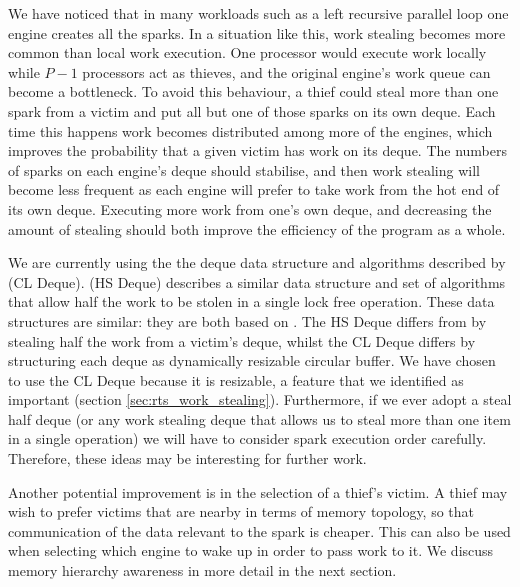 We have noticed that in many workloads such as a left recursive parallel
loop one engine creates all the sparks.
In a situation like this,
work stealing becomes more common than local work execution.
One processor would execute work locally while $P - 1$ processors act as
thieves,
and the original engine's work queue can become a bottleneck.
To avoid this behaviour,
a thief could steal more than one spark from a victim and put all but one of
those sparks on its own deque.
Each time this happens work becomes distributed among more of the engines,
which improves the probability that a given victim has work on its deque.
The numbers of sparks on each engine's deque should stabilise,
and then work stealing will become less frequent as each engine will prefer to
take work from the hot end of its own deque.
Executing more work from one's own deque, and decreasing the amount of stealing
should both improve the efficiency of the program as a whole.

We are currently using the the deque data structure and algorithms described by
\citet{Chase_2005_wsdeque} (CL Deque).
\citet{hendler:2002:stealhalf} (HS Deque) describes a similar data structure
and set of algorithms that allow half the work to be stolen in a single lock
free operation.
These data structures are similar:
they are both based on \citet{arora:1998:work-stealing}.
The HS Deque differs from 
\citet{arora:1998:work-stealing}
by stealing half the work from a victim's deque,
whilst the CL Deque differs by structuring each deque as
dynamically resizable circular buffer.
We have chosen to use the CL Deque because it is resizable,
a feature that we identified as important (section \ref{sec:rts_work_stealing}).
Furthermore,
if we ever adopt a steal half deque (or any work stealing deque that allows
us to steal more than one item in a single operation) we will have to
consider spark execution order carefully.
Therefore,
these ideas may be interesting for further work.

Another potential improvement is in the selection of a thief's victim.
A thief may wish to prefer victims that are nearby in terms of memory
topology, so that communication of the data relevant to the spark is
cheaper.
This can also be used when selecting which engine to wake up in order to
pass work to it.
We discuss memory hierarchy awareness in more detail in the next section.

